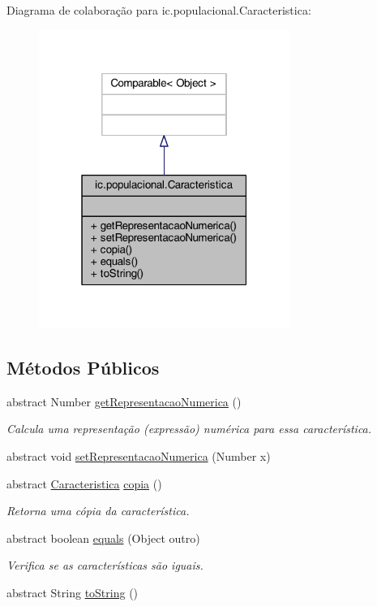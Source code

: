 Diagrama de colaboração para ic.\-populacional.\-Caracteristica\-:\nopagebreak
\begin{figure}[H]
\begin{center}
\leavevmode
\includegraphics[width=232pt]{classic_1_1populacional_1_1_caracteristica__coll__graph}
\end{center}
\end{figure}
\subsection*{Métodos Públicos}
\begin{DoxyCompactItemize}
\item 
abstract Number \hyperlink{classic_1_1populacional_1_1_caracteristica_aa67edfbd3a1ff6c468e4cb81e657a0d4}{get\-Representacao\-Numerica} ()
\begin{DoxyCompactList}\small\item\em Calcula uma representação (expressão) numérica para essa característica. \end{DoxyCompactList}\item 
abstract void \hyperlink{classic_1_1populacional_1_1_caracteristica_a4d3183a4d015c596ad4cf57a05ecd42c}{set\-Representacao\-Numerica} (Number x)
\item 
abstract \hyperlink{classic_1_1populacional_1_1_caracteristica}{Caracteristica} \hyperlink{classic_1_1populacional_1_1_caracteristica_acee32af34f20851ad427edfa2032564f}{copia} ()
\begin{DoxyCompactList}\small\item\em Retorna uma cópia da característica. \end{DoxyCompactList}\item 
abstract boolean \hyperlink{classic_1_1populacional_1_1_caracteristica_aa12ac72aa13bcb558ba51c66da0a2594}{equals} (Object outro)
\begin{DoxyCompactList}\small\item\em Verifica se as características são iguais. \end{DoxyCompactList}\item 
abstract String \hyperlink{classic_1_1populacional_1_1_caracteristica_a9c9f2566f8fd2f2fd585edc5fe0491c4}{to\-String} ()
\end{DoxyCompactItemize}


